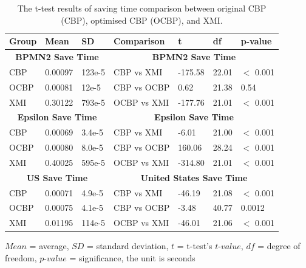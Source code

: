 \documentclass{llncs}
\begin{document}
{ \vspace{-25pt}
  \begin{table}[ht]
     \footnotesize
     \centering
     \caption{The t-test results of saving time comparison between original CBP (CBP), optimised CBP (OCBP), and XMI.}
     \label{table:ttest_results_savetime}
     \begin{tabular}
         {|p{}p{}p{}|p{}p{}p{}p{}|}
         \hline 
         
         Group & Mean & SD & Comparison & t  & df & p-value \\
         \hline 
         \multicolumn{3}{|c|}{\textbf{BPMN2 Save Time}} & \multicolumn{4}{c|}{\textbf{BPMN2 Save Time}}\\
         CBP & 0.00097    & 123e-5 & CBP vs XMI &  -175.58    & 22.01 & $<$ 0.001 \\  
         OCBP & 0.00081   & 12e-5 & CBP vs OCBP & 0.62 & 21.38  & 0.54 \\  
         XMI & 0.30122   & 793e-5 & OCBP vs XMI & -177.76    & 21.01  & $<$ 0.001 \\ 
         \hline 
         
         \multicolumn{3}{|c|}{\textbf{Epsilon Save Time}} & \multicolumn{4}{c|}{\textbf{Epsilon Save Time}}\\
         CBP & 0.00069    & 3.4e-5 &  CBP vs XMI & -6.01   &21.00 & $<$ 0.001 \\
         OCBP & 0.00080   & 8.0e-5 & CBP vs OCBP & 160.06 & 28.24 & $<$ 0.001 \\  
         XMI & 0.40025   & 595e-5 & OCBP vs XMI & -314.80  & 21.01  & $<$ 0.001 \\ 
         \hline 
         
         \multicolumn{3}{|c|}{\textbf{US Save Time}} & \multicolumn{4}{c|}{\textbf{United States Save Time}}\\
         CBP & 0.00071     & 4.9e-5 & CBP vs XMI &  -46.19   & 21.08 & $<$ 0.001 \\ 
         OCBP &0.00075   &  4.1e-5 & CBP vs OCBP &   -3.48 & 40.77 & 0.0012 \\ 
         XMI &  0.01195   & 114e-5 & OCBP vs XMI &  -46.01  & 21.06 & $<$ 0.001 \\ 
         \hline
     \end{tabular}
     \justify
     $Mean$ = average, $SD$ = standard deviation, $t$ = t-test's $t$-$value$, $df$ = degree of freedom, $p$-$value$ = significance, the unit is seconds
 \end{table}
  
}
\end{document}
